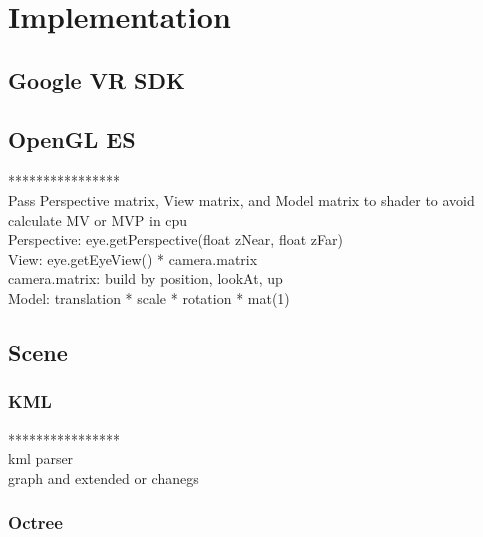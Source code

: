 \label{chapter-implementation}
\chapter{Implementation}

\section{Google VR SDK}

\section{OpenGL ES}

****************\\
Pass Perspective matrix, View matrix, and Model matrix to shader to avoid calculate MV or MVP in cpu\\
Perspective: eye.getPerspective(float zNear, float zFar)\\
View: eye.getEyeView() * camera.matrix\\
camera.matrix: build by position, lookAt, up\\
Model: translation * scale * rotation * mat(1)\\

\section{Scene}

\subsection{KML}

****************\\
kml parser\\
graph and extended or chanegs\\

\subsection{Octree}

